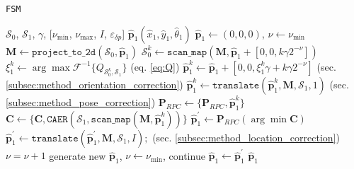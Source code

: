 \begin{algorithm}
  \caption{\texttt{FSM}}
  \begin{spacing}{1.2}
  \begin{algorithmic}[1]
    \REQUIRE $\mathcal{S}_0$, $\mathcal{S}_1$, $\gamma$, [$\nu_{\min}$, $\nu_{\max}$, $I$, $\varepsilon_{\delta p}$]
    \ENSURE $\hat{\bm{p}}_1(\hat{x}_1, \hat{y}_1, \hat{\theta}_1)$
    \STATE $\hat{\bm{p}}_1 \leftarrow (0,0,0)$, $\nu \leftarrow \nu_{\min}$
    \STATE $\bm{M} \leftarrow \texttt{project\_to\_2d}(\mathcal{S}_0, \hat{\bm{p}}_1)$
    \WHILE{$\nu \leq \nu_{\max}$}
        \STATE $\mathcal{S}_0^k \leftarrow \texttt{scan\_map}(\bm{M}, \hat{\bm{p}}_1 + [0,0,k \gamma 2^{-\nu}])$
        \STATE $\xi_1^k \leftarrow \arg\max \mathcal{F}^{-1}\{Q_{\mathcal{S}_0^k, \mathcal{S}_1}\}$ \hfill (eq. \ref{eq:Q})
        \STATE $\hat{\bm{p}}_1^k \leftarrow \hat{\bm{p}}_1 + [0,0, \xi_1^k \gamma + k \gamma 2^{-\nu}]$ \hfill (sec. \ref{subsec:method_orientation_correction})
        \STATE $\hat{\bm{p}}_1^{k} \leftarrow \texttt{translate}(\hat{\bm{p}}_1^k, \bm{M}, \mathcal{S}_1, 1)$ \hfill (sec. \ref{subsec:method_pose_correction})
        \STATE $\bm{P}_{RPC} \leftarrow \{\bm{P}_{RPC}, \hat{\bm{p}}_1^{k}\}$
        \STATE $\bm{C} \leftarrow \{\bm{C}, \texttt{CAER}(\mathcal{S}_1,\texttt{scan\_map}(\bm{M},\hat{\bm{p}}_1^{k}))\}$
      \ENDFOR
      \STATE $\hat{\bm{p}}_1^\prime \leftarrow \bm{P}_{RPC}(\arg\min \bm{C})$
      \STATE $\hat{\bm{p}}_1^\prime \leftarrow \texttt{translate}(\hat{\bm{p}}_1^\prime, \bm{M}, \mathcal{S}_1, I);$  \hfill (sec. \ref{subsec:method_location_correction})
        \STATE $\nu = \nu + 1$
      \ENDIF
        \STATE generate new $\hat{\bm{p}}_1$, $\nu \leftarrow \nu_{\min}$, continue
      \ENDIF
      \STATE $\hat{\bm{p}}_1 \leftarrow \hat{\bm{p}}_1^\prime$
    \ENDWHILE
    \RETURN $\hat{\bm{p}}_1$
  \end{algorithmic}
  \end{spacing}
  \label{alg:algorithm_fsm}
\end{algorithm}

